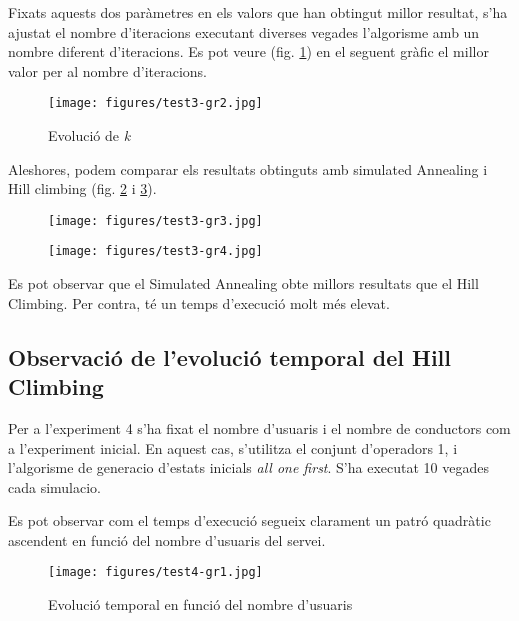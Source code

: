 Fixats aquests dos paràmetres en els valors que han obtingut millor resultat, s'ha ajustat el nombre d'iteracions executant diverses 
vegades l'algorisme amb un nombre diferent d'iteracions. Es pot veure (fig. \ref{test3-gr2}) en el seguent gràfic el millor valor per al nombre d'iteracions.

\begin{figure}[H]
\begin{center}
 \texttt{[image: figures/test3-gr2.jpg]}
 \label{test3-gr2}
\caption{Evolució de \emph{k}}
\end{center}
\end{figure}


Aleshores, podem comparar els resultats obtinguts amb simulated Annealing i Hill climbing (fig. \ref{test3-gr3} i \ref{test3-gr4}).


\begin{figure}[H]
\begin{center} 
 \texttt{[image: figures/test3-gr3.jpg]}
\label{test3-gr3}
\caption{}
\end{center}
\end{figure}


\begin{figure}[H]
\begin{center}
 \texttt{[image: figures/test3-gr4.jpg]}
 \label{test3-gr4}
\caption{}
\end{center}
\end{figure}

Es pot observar que el Simulated Annealing obte millors resultats que el Hill Climbing. Per contra, té un temps d'execució molt més elevat.


\subsection{Observació de l'evolució temporal del Hill Climbing}
Per a l'experiment 4 s'ha fixat el nombre d'usuaris i el nombre de conductors com a l'experiment inicial.
En aquest cas, s'utilitza el conjunt d'operadors 1, i l'algorisme de generacio d'estats inicials \emph{all one first}.
S'ha executat 10 vegades cada simulacio.

Es pot observar com el temps d'execució segueix clarament un patró quadràtic ascendent en funció del nombre d'usuaris
del servei.

\begin{figure}[H]
\begin{center}
 \texttt{[image: figures/test4-gr1.jpg]}
 \label{test4-gr1}
\caption{Evolució temporal en funció del nombre d'usuaris}
\end{center}
\end{figure}


